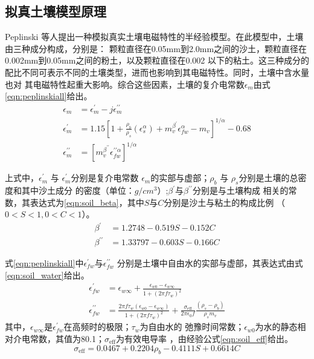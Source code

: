 \subsection{拟真土壤模型原理}
Peplinski 等人提出一种模拟真实土壤电磁特性的半经验模型。在此模型中，土壤由三种成分构成，分别是：
颗粒直径在0.05mm到2.0mm之间的沙土，颗粒直径在0.002mm到0.05mm之间的粉土，以及颗粒直径在0.002
以下的粘土。这三种成分的配比不同可表示不同的土壤类型，进而也影响到其电磁特性。同时，土壤中含水量也对
其电磁特性起重大影响。综合这些因素，土壤的复介电常数$\epsilon_m$由式\ref{eqn:peplinskiall}给出。
\begin{equation} 
	\label{eqn:peplinskiall} 
	\begin{aligned} \epsilon_{m} &=\epsilon_{m}^{\prime}-j \epsilon_{m}^{\prime \prime} \\ 
\epsilon_{m}^{\prime} &=1.15 \left[1+\frac{\rho_{b}}{\rho_{s}}\left(\epsilon_{s}^{\alpha}\right)+m_{v}^{\beta^{\prime}} \epsilon_{f w}^{\alpha}-m_{v}\right]^{1 / \alpha} - 0.68\\ 
\epsilon_{m}^{\prime \prime} &=\left[m_{v}^{\beta^{\prime \prime}} \epsilon_{f w}^{\prime \prime \alpha}\right]^{1 / \alpha} \end{aligned}
\end{equation}

上式中，$\epsilon_{m}^{\prime}$ 与 $\epsilon_{m}^{\prime}$分别是复介电常数
$\epsilon_m$的实部与虚部；$\rho_{b}$ 与 $\rho_{s}$分别是土壤的总密度和其中沙土成分
的密度（单位：$g/cm^3$）;$\beta^\prime$与$\beta^{\prime \prime}$分别是与土壤构成
相关的常数，其表达式为\ref{eqn:soil_beta}，其中$S$与$C$分别是沙土与粘土的构成比例
（$0<S<1, 0<C<1$）。
\begin{equation} 
	\label{eqn:soil_beta}
	\begin{aligned}
\beta^{\prime}&=1.2748-0.519 S-0.152 C \\
\beta^{\prime \prime}&=1.33797-0.603 S-0.166 C
	\end{aligned}
\end{equation}

式\ref{eqn:peplinskiall}中$\epsilon_{f w}^{\prime}$与$\epsilon_{f w}^{\prime \prime}$
分别是土壤中自由水的实部与虚部，其表达式由式\ref{eqn:soil_water}给出。
\begin{equation} 
	\label{eqn:soil_water}
	\begin{aligned}
		\epsilon_{f w}^{\prime}&=\epsilon_{w \infty}+\frac{\epsilon_{w 0}-\epsilon_{w \infty}}{1+\left(2 \pi f \tau_{w}\right)^{2}} \\
		\epsilon_{f w}^{\prime \prime}&=\frac{2 \pi f \tau_{w}\left(\epsilon_{w 0}-\epsilon_{w \infty}\right)}{1+\left(2 \pi f \tau_{w}\right)^{2}}+\frac{\sigma_{\mathrm{eff}}}{2 \pi \epsilon_{0} f} \frac{\left(\rho_{s}-\rho_{b}\right)}{\rho_{s} m_{v}}
	\end{aligned}
\end{equation}
其中，$\epsilon_{w \infty}$是$\epsilon_{f w}^{\prime}$在高频时的极限；$\tau_{w}$为自由水的
弛豫时间常数；$\epsilon_{w 0}$为水的静态相对介电常数，其值为80.1；$\sigma_{\mathrm{eff}}$为有效电导率
，由经验公式\ref{eqn:soil_eff}给出。
\begin{equation}
	\label{eqn:soil_eff}
\sigma_{\mathrm{eff}}=0.0467+0.2204 \rho_{b}-0.4111 S+0.6614 C
\end{equation}

